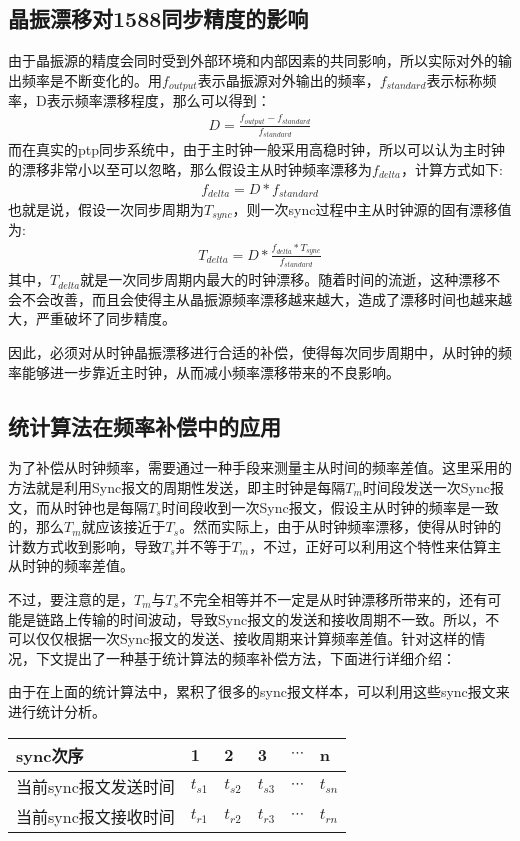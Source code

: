 \subsection{晶振漂移对1588同步精度的影响}
由于晶振源的精度会同时受到外部环境和内部因素的共同影响，所以实际对外的输出频率是不断变化的。用$f_{output}$表示晶振源对外输出的频率，$f_{standard}$表示标称频率，D表示频率漂移程度，那么可以得到：
\begin {align}
D = \frac{f_{output} - f_{standard}}{f_{standard}}
\end{align}
而在真实的ptp同步系统中，由于主时钟一般采用高稳时钟，所以可以认为主时钟的漂移非常小以至可以忽略，那么假设主从时钟频率漂移为$f_{delta}$，计算方式如下:
\begin {align}
f_{delta} = D * f_{standard}
\end{align}
也就是说，假设一次同步周期为$T_{sync}$，则一次sync过程中主从时钟源的固有漂移值为:
\begin {align}
T_{delta} = D * \frac{f_{delta} * T_{sync}}{f_{standard}}
\end{align}
其中，$T_{delta}$就是一次同步周期内最大的时钟漂移。随着时间的流逝，这种漂移不会不会改善，而且会使得主从晶振源频率漂移越来越大，造成了漂移时间也越来越大，严重破坏了同步精度。

因此，必须对从时钟晶振漂移进行合适的补偿，使得每次同步周期中，从时钟的频率能够进一步靠近主时钟，从而减小频率漂移带来的不良影响。

\subsection{统计算法在频率补偿中的应用}
为了补偿从时钟频率，需要通过一种手段来测量主从时间的频率差值。这里采用的方法就是利用Sync报文的周期性发送，即主时钟是每隔$T_{m}$时间段发送一次Sync报文，而从时钟也是每隔$T_{s}$时间段收到一次Sync报文，假设主从时钟的频率是一致的，那么$T_{m}$就应该接近于$T_{s}$。然而实际上，由于从时钟频率漂移，使得从时钟的计数方式收到影响，导致$T_{s}$并不等于$T_{m}$，不过，正好可以利用这个特性来估算主从时钟的频率差值。

不过，要注意的是，$T_{m}$与$T_{s}$不完全相等并不一定是从时钟漂移所带来的，还有可能是链路上传输的时间波动，导致Sync报文的发送和接收周期不一致。所以，不可以仅仅根据一次Sync报文的发送、接收周期来计算频率差值。针对这样的情况，下文提出了一种基于统计算法的频率补偿方法，下面进行详细介绍：

由于在上面的统计算法中，累积了很多的sync报文样本，可以利用这些sync报文来进行统计分析。
\begin{table}[htpb]
  \centering
  \begin{tabular}{llllll} \toprule
    sync次序 & 1 & 2 & 3 & $\cdots$ & n \\ \midrule
    当前sync报文发送时间 & $t_{s1}$ & $t_{s2}$ & $t_{s3}$ & $\cdots$ & $t_{sn}$ \\ \midrule
    当前sync报文接收时间 & $t_{r1}$ & $t_{r2}$ & $t_{r3}$ & $\cdots$ & $t_{rn}$  \\ \bottomrule
  \end{tabular}
\end{table}


